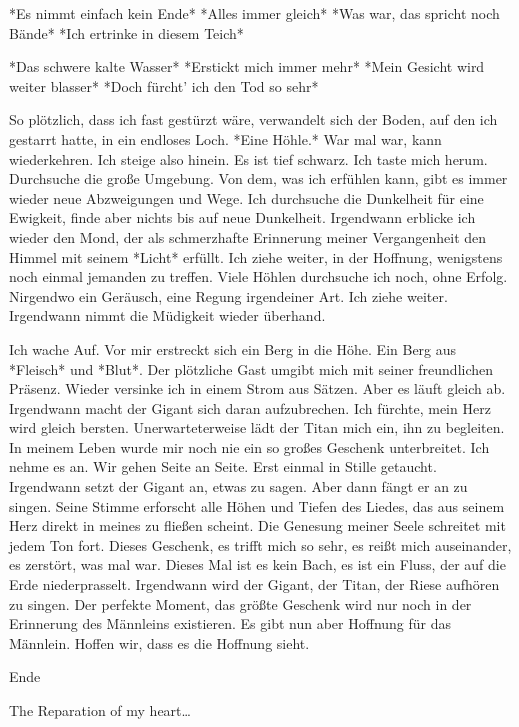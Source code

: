 \documentclass{article}
\begin{document}
	*Es nimmt einfach kein Ende*  
	*Alles immer gleich*  
	*Was war, das spricht noch Bände*  
	*Ich ertrinke in diesem Teich*
	
	*Das schwere kalte Wasser*  
	*Erstickt mich immer mehr*  
	*Mein Gesicht wird weiter blasser*  
	*Doch fürcht’ ich den Tod so sehr*
	
	So plötzlich, dass ich fast gestürzt wäre, verwandelt sich der Boden, auf den ich gestarrt hatte, in ein endloses Loch. *Eine Höhle.* War mal war, kann wiederkehren. Ich steige also hinein. Es ist tief schwarz. Ich taste mich herum. Durchsuche die große Umgebung. Von dem, was ich erfühlen kann, gibt es immer wieder neue Abzweigungen und Wege. Ich durchsuche die Dunkelheit für eine Ewigkeit, finde aber nichts bis auf neue Dunkelheit. Irgendwann erblicke ich wieder den Mond, der als schmerzhafte Erinnerung meiner Vergangenheit den Himmel mit seinem *Licht* erfüllt. Ich ziehe weiter, in der Hoffnung, wenigstens noch einmal jemanden zu treffen.  
	Viele Höhlen durchsuche ich noch, ohne Erfolg. Nirgendwo ein Geräusch, eine Regung irgendeiner Art. Ich ziehe weiter. Irgendwann nimmt die Müdigkeit wieder überhand.
	
	Ich wache Auf.  
	Vor mir erstreckt sich ein Berg in die Höhe. Ein Berg aus *Fleisch* und *Blut*. Der plötzliche Gast umgibt mich mit seiner freundlichen Präsenz. Wieder versinke ich in einem Strom aus Sätzen. Aber es läuft gleich ab. Irgendwann macht der Gigant sich daran aufzubrechen. Ich fürchte, mein Herz wird gleich bersten. Unerwarteterweise lädt der Titan mich ein, ihn zu begleiten. In meinem Leben wurde mir noch nie ein so großes Geschenk unterbreitet. Ich nehme es an.  
	Wir gehen Seite an Seite. Erst einmal in Stille getaucht. Irgendwann setzt der Gigant an, etwas zu sagen. Aber dann fängt er an zu singen. Seine Stimme erforscht alle Höhen und Tiefen des Liedes, das aus seinem Herz direkt in meines zu fließen scheint. Die Genesung meiner Seele schreitet mit jedem Ton fort. Dieses Geschenk, es trifft mich so sehr, es reißt mich auseinander, es zerstört, was mal war. Dieses Mal ist es kein Bach, es ist ein Fluss, der auf die Erde niederprasselt. Irgendwann wird der Gigant, der Titan, der Riese aufhören zu singen. Der perfekte Moment, das größte Geschenk wird nur noch in der Erinnerung des Männleins existieren. Es gibt nun aber Hoffnung für das Männlein. Hoffen wir, dass es die Hoffnung sieht.
	
	Ende
	
	The Reparation of my heart…
\end{document}
